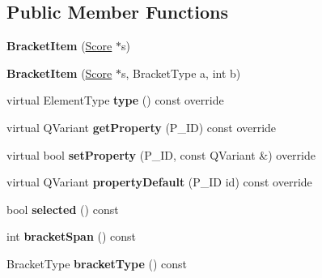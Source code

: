 \subsection*{Public Member Functions}
\begin{DoxyCompactItemize}
\item 
\mbox{\label{class_ms_1_1_bracket_item_a948e0e14ed96484229f4c3ac80508b7d}} 
{\bfseries Bracket\+Item} (\hyperlink{class_ms_1_1_score}{Score} $\ast$s)
\item 
\mbox{\label{class_ms_1_1_bracket_item_afaaf15e9d384344ba0de5f3098223a03}} 
{\bfseries Bracket\+Item} (\hyperlink{class_ms_1_1_score}{Score} $\ast$s, Bracket\+Type a, int b)
\item 
\mbox{\label{class_ms_1_1_bracket_item_a88c1749ed0d5edc93f140cd3e2e86890}} 
virtual Element\+Type {\bfseries type} () const override
\item 
\mbox{\label{class_ms_1_1_bracket_item_aa573efb239d006bca732f822ca8aa88b}} 
virtual Q\+Variant {\bfseries get\+Property} (P\+\_\+\+ID) const override
\item 
\mbox{\label{class_ms_1_1_bracket_item_aa9f9aa05217a3dc28fbd8da7b6861577}} 
virtual bool {\bfseries set\+Property} (P\+\_\+\+ID, const Q\+Variant \&) override
\item 
\mbox{\label{class_ms_1_1_bracket_item_a169f3d57835dc4f13902876b28246d0c}} 
virtual Q\+Variant {\bfseries property\+Default} (P\+\_\+\+ID id) const override
\item 
\mbox{\label{class_ms_1_1_bracket_item_a7b906fd280aa9ea48db0af1bb9ed30a6}} 
bool {\bfseries selected} () const
\item 
\mbox{\label{class_ms_1_1_bracket_item_a4b32479e4e85cc13461ad0d086fce385}} 
int {\bfseries bracket\+Span} () const
\item 
\mbox{\label{class_ms_1_1_bracket_item_a2bac44961505757359adf8ddfb5bcd8d}} 
Bracket\+Type {\bfseries bracket\+Type} () const

\end{DoxyCompactItemize}
